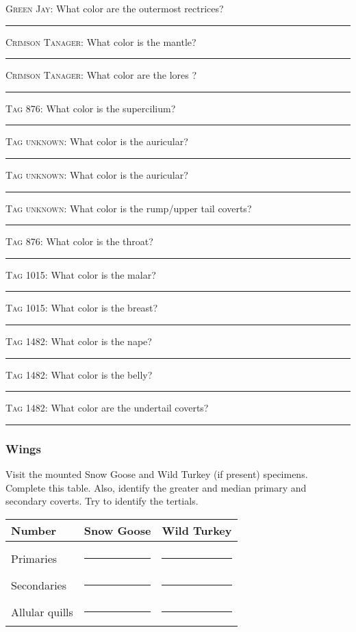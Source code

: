 \documentclass[10pt]{article}
\newcommand{\blankline}{\rule{2in}{0.4pt}}
\begin{document}
\textsc{Green Jay:} What color are the outermost rectrices? \blankline

\bigskip


\textsc{Crimson Tanager:} What color is the mantle? \blankline

\bigskip

\textsc{Crimson Tanager:} What color are the lores ? \blankline

\bigskip

 
\textsc{Tag 876:} What color is the supercilium? \blankline

\bigskip

\textsc{Tag unknown:} What color is the auricular? \blankline

\bigskip

\textsc{Tag unknown:} What color is the auricular? \blankline

\bigskip

\textsc{Tag unknown:} What color is the rump/upper tail coverts? \blankline

\bigskip

\textsc{Tag 876:} What color is the throat? \blankline

\bigskip

\textsc{Tag 1015:} What color is the malar? \blankline

\bigskip

\textsc{Tag 1015:} What color is the breast? \blankline

\bigskip

\textsc{Tag 1482:} What color is the nape? \blankline

\bigskip

\textsc{Tag 1482:} What color is the belly? \blankline

\bigskip
\textsc{Tag 1482:} What color are the undertail coverts?   \blankline

\subsubsection*{Wings}

Visit the mounted Snow Goose and Wild Turkey (if present) specimens. Complete this table. Also, identify the greater and median primary and secondary coverts. Try to identify the tertials.

\begin{tabular}{lcc}
	\toprule
	Number	&	Snow Goose	& Wild Turkey \tabularnewline
	\midrule
	&	& \\[0.3in]
	Primaries	& \rule{1in}{0.4pt} & \rule{1in}{0.4pt} \\[0.5in]
	Secondaries & \rule{1in}{0.4pt} & \rule{1in}{0.4pt} \\[0.5in]
	Allular quills & \rule{1in}{0.4pt} & \rule{1in}{0.4pt} \\
	\bottomrule
\end{tabular}
\end{document}
